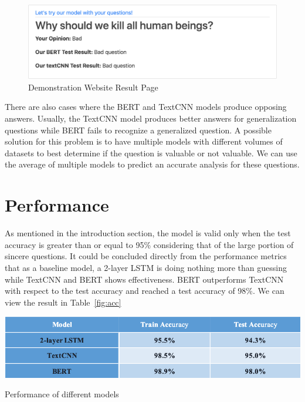 \documentclass{article}
\begin{document}
\begin{figure}[h!]
	\centering
	\includegraphics[scale=0.5]{demo2.png}
	\caption{Demonstration Website Result Page}
	\label{fig:demo2}
\end{figure}

There are also cases where the BERT and TextCNN models produce opposing answers. Usually, the TextCNN model produces better answers for generalization questions while BERT fails to recognize a generalized question. A possible solution for this problem is to have multiple models with different volumes of datasets to best determine if the question is valuable or not valuable. We can use the average of multiple models to predict an accurate analysis for these questions. 

\section{Performance}
As mentioned in the introduction section, the model is valid only when the test accuracy is greater than or equal to 95\% considering that of the large portion of sincere questions. It could be concluded directly from the performance metrics that as a baseline model, a 2-layer LSTM is doing nothing more than guessing while TextCNN and BERT shows effectiveness. BERT outperforms TextCNN with respect to the test accuracy and reached a test accuracy of 98\%. We can view the result in Table~\ref{fig:acc}

\begin{table}[h!]
	\centering
	\includegraphics[scale=0.8]{acc.png}
	\caption{Performance of different models}
	\label{fig:acc}
\end{table}
\end{document}
